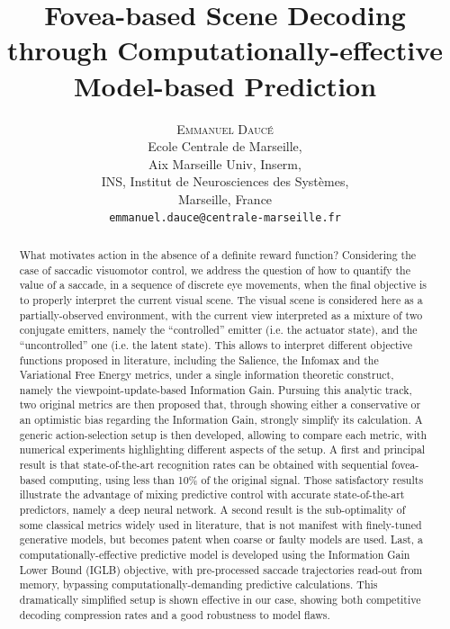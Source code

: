 \documentclass[12pt,twoside,openright]{article}
\title{\textbf{Fovea-based Scene Decoding through Computationally-effective Model-based Prediction}}
\author{\textsc{Emmanuel Daucé}\\
	Ecole Centrale de Marseille,\\ 
	Aix Marseille Univ, Inserm,\\ 
	INS, Institut de Neurosciences des Systèmes, \\
	Marseille, France\\
	\texttt{emmanuel.dauce@centrale-marseille.fr} 
}%
\date{}
\begin{document}
	
\maketitle
	
\begin{abstract}
{\color{Purple} What motivates action in the absence of a definite reward function? Considering the case of saccadic visuomotor control, we address the question of how to quantify the value of a saccade, in a sequence of discrete eye movements, when the final objective is to properly interpret the current visual scene.
The visual scene is considered here as a partially-observed environment,
with the current view interpreted as a mixture of two conjugate emitters, namely the ``controlled'' emitter (i.e. the actuator state), and the ``uncontrolled'' one (i.e. the latent state). 
This allows to interpret different objective functions proposed in literature, 
including the Salience, the Infomax and the Variational Free Energy metrics, under a single information theoretic construct, namely the viewpoint-update-based Information Gain.
Pursuing this analytic track, two original metrics are then proposed that, through showing either a conservative or an optimistic bias regarding the Information Gain, strongly simplify its calculation.
A generic action-selection setup is then developed, allowing to compare each metric,}
with numerical experiments highlighting different aspects of the setup. 
A first and principal result is that state-of-the-art recognition rates can be obtained with sequential fovea-based computing, using less than 10\% of the original signal. Those satisfactory results illustrate the advantage of mixing predictive control with accurate state-of-the-art predictors, namely a deep neural network. 
A second result is the sub-optimality of some classical metrics widely used in literature, that is not manifest with finely-tuned generative models, but becomes patent when coarse or faulty models are used.
Last, a computationally-effective predictive model is developed using the {\color{Purple} Information Gain Lower Bound (IGLB)} objective, with pre-processed saccade trajectories read-out from memory, bypassing computationally-demanding predictive calculations.  This dramatically simplified setup is shown effective in our case, showing both competitive decoding compression rates and a good robustness to model flaws. 

\end{abstract}
\end{document}
